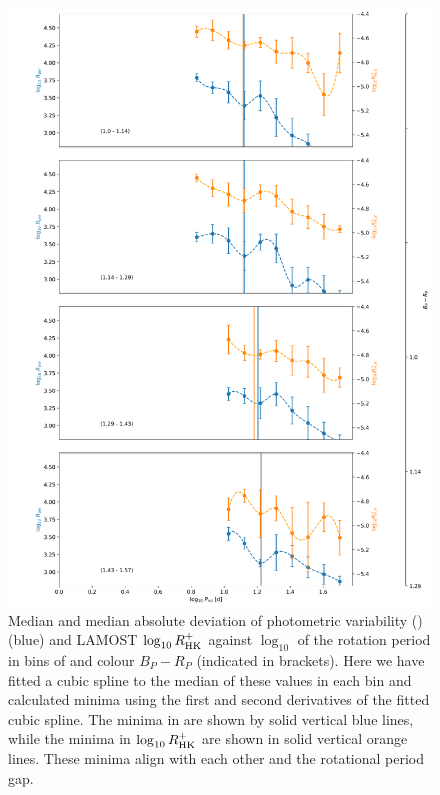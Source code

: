 \begin{figure}
\centering
  \includegraphics[width=\textwidth]{Figures/rot_gap_figures/rot_vs_rper_rhk_minima.png}
  \caption[Median and median absolute deviation of photometric variability (\rper{}) (blue) and LAMOST $\log_{10}R^{+}_{\rm{HK}}$ against $\log_{10}$ of the rotation period in bins of and colour \gaia{} $B_P-R_P$.]{
  Median and median absolute deviation of photometric variability (\rper{}) (blue) and LAMOST $\log_{10}R^{+}_{\rm{HK}}$ against $\log_{10}$ of the rotation period in bins of and colour \gaia{} $B_P-R_P$ (indicated in brackets). Here we have fitted a cubic spline to the median of these values in each bin and calculated minima using the first and second derivatives of the fitted cubic spline. The minima in \rper{} are shown by solid vertical blue lines, while the minima in $\log_{10}R^{+}_{\rm{HK}}$ are shown in solid vertical orange lines. These minima align with each other and the rotational period gap.}
  \label{fig:rot_rper_rhk}
\end{figure}

